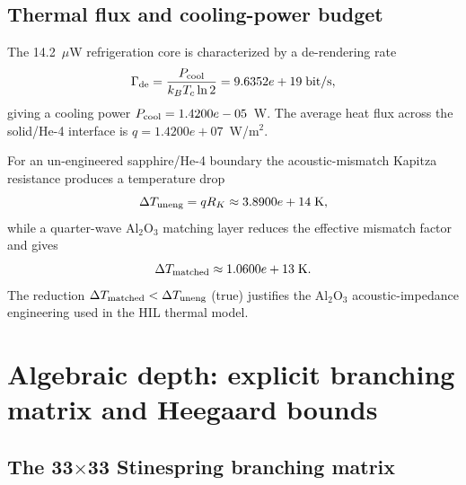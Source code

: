 \documentclass[aps,pra,10pt,onecolumn,superscriptaddress,nofootinbib,longbibliography,floatfix]{revtex4-2}
\newcommand{\ExoticFluxGammaDe}{9.6352e+19}%
\newcommand{\ExoticFluxCoolingPower}{1.4200e-05}%
\newcommand{\ExoticFluxHeatFlux}{1.4200e+07}%
\newcommand{\ExoticKapitzaDropUnengineered}{3.8900e+14}%
\newcommand{\ExoticKapitzaDropMatched}{1.0600e+13}%
\newcommand{\ExoticKapitzaJustified}{true}%
\begin{document}
\subsection{Thermal flux and cooling-power budget}

The 14.2~$\mu$W refrigeration core is characterized by a de-rendering rate
%
\begin{equation}
\Gamma_{\rm de} = \frac{P_{\rm cool}}{k_B T_c \ln 2} = \ExoticFluxGammaDe{} \;\mathrm{bit/s},
\end{equation}
%
giving a cooling power $P_{\rm cool} = \ExoticFluxCoolingPower{}$~W.  The average heat flux across the solid/He-4 interface is $q = \ExoticFluxHeatFlux{}$~W/m$^2$.

For an un-engineered sapphire/He-4 boundary the acoustic-mismatch Kapitza resistance produces a temperature drop
%
\begin{equation}
\Delta T_{\rm uneng} = q R_K \approx \ExoticKapitzaDropUnengineered{} \;\mathrm{K},
\end{equation}
%
while a quarter-wave Al$_2$O$_3$ matching layer reduces the effective mismatch factor and gives
%
\begin{equation}
\Delta T_{\rm matched} \approx \ExoticKapitzaDropMatched{} \;\mathrm{K}.
\end{equation}
%
The reduction $\Delta T_{\rm matched} < \Delta T_{\rm uneng}$ (\ExoticKapitzaJustified{}) justifies the Al$_2$O$_3$ acoustic-impedance engineering used in the HIL thermal model.

\section{Algebraic depth: explicit branching matrix and Heegaard bounds}
\label{sec:algebraic-depth}

\subsection{\texorpdfstring{The 33$\times$33 Stinespring branching matrix}{The 33 by 33 Stinespring branching matrix}}
\end{document}
